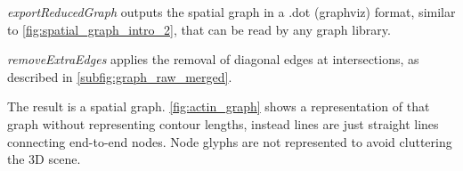 \textit{exportReducedGraph} outputs the spatial graph in a .dot (graphviz) format, similar to \autoref{fig:spatial_graph_intro_2}, that can be read by any graph library.

\textit{removeExtraEdges} applies the removal of diagonal edges at intersections, as described in \autoref{subfig:graph_raw_merged}.

The result is a spatial graph. \autoref{fig:actin_graph} shows a representation of that graph without representing contour lengths, instead lines are just straight lines connecting end-to-end nodes. Node glyphs are not represented to avoid cluttering the 3D scene.




